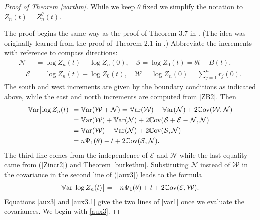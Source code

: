\documentclass[11pt]{amsart}
\numberwithin{equation}{section}
\theoremstyle{remark}
\begin{document}
\begin{proof}[Proof of Theorem \ref{varthm}]  While we keep ${\theta}$ fixed we simplify the notation
to $Z_n(t)=Z_n^{\theta}(t)$. 

The proof begins the same way as the proof of 
Theorem 3.7 in \cite{sepp-poly}. (The idea was
originally learned from the proof of Theorem 2.1 in \cite{cato-groe-06}.)
Abbreviate the increments with reference to compass directions:
\begin{align*}
{{\mathcal N}} &=\log Z_{n}(t)-\log Z_{n}(0), 
\quad {{\mathcal S}} =\log Z_{0}(t)={\theta} t-B(t),\\
\quad {{\mathcal E}} &=\log Z_{n}(t)-\log Z_{0}(t),  
\quad {{\mathcal W}} =\log Z_{n}(0)=\sum_{j=1}^n r_j(0). 
\end{align*}
The south and west increments are given by the boundary conditions
as indicated above, while the east and {north} increments are computed 
from \eqref{ZB2}. 
Then 
\begin{equation}\begin{aligned}
{{\rm\mathbb{V}ar}}\bigl[\log Z_{n}(t)\bigr]&={{\rm\mathbb{V}ar}}({{\mathcal W}} +{{\mathcal N}} )={{\rm\mathbb{V}ar}}({{\mathcal W}} )+{{\rm\mathbb{V}ar}}({{\mathcal N}} )+2{{\rm\mathbb{C}ov}}({{\mathcal W}} ,{{\mathcal N}} )\\
&={{\rm\mathbb{V}ar}}({{\mathcal W}} )+{{\rm\mathbb{V}ar}}({{\mathcal N}} )+2{{\rm\mathbb{C}ov}}({{\mathcal S}} +{{\mathcal E}} -{{\mathcal N}} ,{{\mathcal N}} )\\
 &= {{\rm\mathbb{V}ar}}({{\mathcal W}} )-{{\rm\mathbb{V}ar}}({{\mathcal N}} )+2{{\rm\mathbb{C}ov}}({{\mathcal S}} ,{{\mathcal N}} )\\
&=n{\Psi_1}({\theta})-t+2{{\rm\mathbb{C}ov}}({{\mathcal S}} ,{{\mathcal N}} ).\\
\end{aligned}\label{aux3}\end{equation}
{The third line comes from the independence of ${{\mathcal E}} $ and ${{\mathcal N}} $ while the  last equality came 
 from (\ref{Zincr2}) and Theorem \ref{burkethm}.} Substituting ${{\mathcal N}}$ instead of
${{\mathcal W}}$ in the covariance in the second line of (\ref{aux3}) leads to the formula 
\begin{equation}
{{\rm\mathbb{V}ar}}\bigl[\log Z_{n}(t)\bigr] =  -n{\Psi_1}({\theta})+t
+2{{\rm\mathbb{C}ov}}({{\mathcal E}},{{\mathcal W}} ).
\label{aux3.1}\end{equation}
Equations \eqref{aux3} and \eqref{aux3.1} give the two lines of 
\eqref{var1} once we evaluate the covariances.  
We begin with \eqref{aux3}. 


\end{proof}
\end{document}
